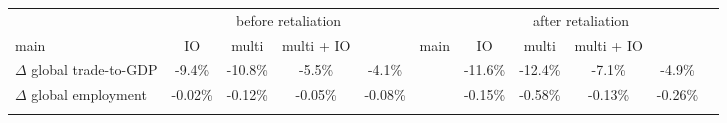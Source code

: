 \begin{tabular}{lcccccccccc}
\toprule
& \multicolumn{4}{c}{before retaliation} && \multicolumn{4}{c}{after retaliation} \\
\cmidrule(lr){2-5} \cmidrule(lr){7-10}
main & IO & multi & multi + IO  && main & IO & multi & multi + IO \\
\midrule
$\Delta$ global trade-to-GDP &
-9.4\% & 
-10.8\% &
-5.5\% & 
-4.1\% && 
-11.6\% & 
-12.4\% &
-7.1\% & 
-4.9\% \\ 
 \addlinespace[3pt]
$\Delta$ global employment &
-0.02\% & 
-0.12\% &
-0.05\% & 
-0.08\% && 
-0.15\% & 
-0.58\% &
-0.13\% & 
-0.26\% \\ 
 \addlinespace[3pt]
 \bottomrule
\end{tabular}
